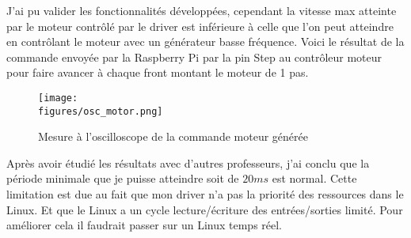 J'ai pu valider les fonctionnalités développées, cependant la vitesse max atteinte par le moteur contrôlé par le driver est inférieure à celle que l'on peut atteindre en contrôlant le moteur avec un générateur basse fréquence. Voici le résultat de la commande envoyée par la Raspberry Pi par la pin Step au contrôleur moteur pour faire avancer à chaque front montant le moteur de 1 pas.

\begin{figure}[H]
    \centering
    \texttt{[image: \\figures/osc\_motor.png]}
    \decoRule
    \caption[
    Mesure à l'oscilloscope de la commande moteur générée]{
	Mesure à l'oscilloscope de la commande moteur générée}
    \label{fig:Mesure à l'oscilloscope de la commande moteur générée}
    \end{figure}

\vspace{1cm}

Après avoir étudié les résultats avec d'autres professeurs, j'ai conclu que la période minimale que je puisse atteindre soit de $20ms$ est normal. Cette limitation est due au fait que mon driver n'a pas la priorité des ressources dans le Linux. Et que le Linux a un cycle lecture/écriture des entrées/sorties limité. Pour améliorer cela il faudrait passer sur un Linux temps réel.


